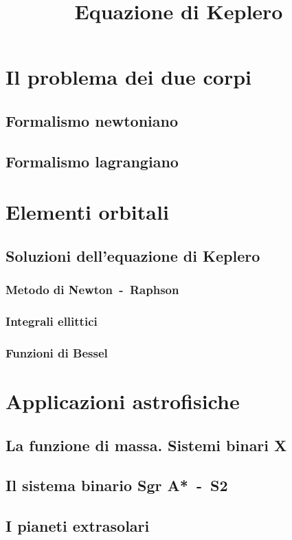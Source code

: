 \documentclass[a4paper,oneside,fleqn]{book}
\title{Equazione di Keplero}
\begin{document}
\maketitle{} %

\chapter{Il problema dei due corpi}
\label{chap:due-corpi}

\section{Formalismo newtoniano}
\label{sec:formalismo-newton}

\section{Formalismo lagrangiano}
\label{sec:formalismo-lagrange}

\chapter{Elementi orbitali}
\label{chap:elementi-orbitali}

\section{Soluzioni dell'equazione di Keplero}
\label{sec:soluzioni}

\subsection{Metodo di Newton~-~Raphson}
\label{sec:newton}

\subsection{Integrali ellittici}
\label{sec:integrali-ellittici}

\subsection{Funzioni di Bessel}
\label{sec:bessel}

\chapter{Applicazioni astrofisiche}
\label{chap:applicazioni}

\section{La funzione di massa. Sistemi binari X}
\label{sec:funzione-massa}

\section{Il sistema binario Sgr A*~-~S2}
\label{sec:sgra}

\section{I pianeti extrasolari}
\label{sec:extrasolari}
\end{document}
